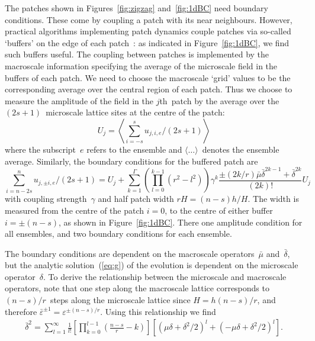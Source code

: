\documentclass[12pt,a4paper]{article}
\begin{document}
The patches shown in Figures~\ref{fig:zigzag} and~\ref{fig:1dBC} need boundary conditions.  These come by coupling a patch with its near neighbours.  However, practical algorithms implementing patch dynamics couple patches via so-called `buffers' on the edge of each patch~\cite[e.g.]{Samaey10}: as indicated in Figure~\ref{fig:1dBC}, we find such buffers useful.  The coupling between patches is implemented by the macroscale information specifying the average of the microscale field in the buffers of each patch.
We need to choose the macroscale `grid' values to be the corresponding average over the central region of each patch.  Thus we choose to measure the amplitude of the field in the $j$th~patch by the average over the $(2s+1)$~microscale lattice sites at the centre of the patch:
\begin{equation}
U_j=\left\langle\sum_{i=-s}^su_{j,i,e}/(2s+1)\right\rangle\label{eq:amp2}
\end{equation}
where the subscript~$e$ refers to the ensemble and $\langle\ldots\rangle$~denotes the ensemble average. Similarly, the boundary conditions for the buffered patch are
\begin{equation}
\sum_{i=n-2s}^nu_{j,\pm i,e}/(2s+1)=U_j+\sum_{k=1}^{\Gamma}\left(\prod_{l=0}^{k-1}(r^2-l^2)\right)\gamma^k\frac{\pm (2k/r)\bar{\mu}\bar{\delta}^{2k-1}+\bar{\delta}^{2k}}{(2k)!}U_j\label{eq:bc2}
\end{equation}
with coupling strength~$\gamma$ and half patch width $rH=(n-s)h/H$. The width is measured from the centre of the patch $i=0$, to the centre of either buffer $i=\pm(n-s)$, as shown in Figure~\ref{fig:1dBC}. There one amplitude condition for all ensembles, and two boundary conditions for each ensemble. 
 
The boundary conditions are dependent on the macroscale operators~$\bar{\mu}$ and~$\bar{\delta}$, but the analytic solution~(\ref{eq:g}) of the evolution is dependent on the microscale operator~$\delta$. To derive the relationship between the microscale and macroscale operators, note that one step along the macroscale lattice corresponds to $(n-s)/r$~steps along the microscale lattice since $H=h(n-s)/r$, and therefore $\bar{\varepsilon}^{\pm 1}=\varepsilon ^{\pm(n-s)/r}$. Using this relationship we find
\begin{align}
\bar{\delta}^2=\sum_{l=1}^{\infty}\frac{1}{l!}\left[\prod_{k=0}^{l-1}\left(\frac{n-s}{r}-k\right)\right]\left[(\mu\delta+\delta^2/2)^l+(-\mu\delta+\delta^2/2)^l\right].
\end{align}
\end{document}
